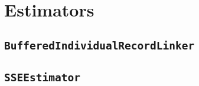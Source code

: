 \section{Estimators}
\label{Implementation:Estimators}

\subsection{\texttt{BufferedIndividualRecordLinker}}
\label{Implementation:Deployment:RecordLinker}

\subsection{\texttt{SSEEstimator}}
\label{Implementation:Deployment:SSE}